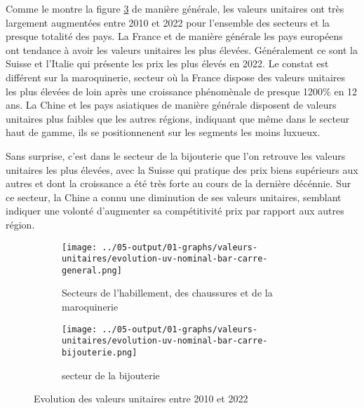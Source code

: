 \documentclass[french,10pt,a4paper]{article}
\begin{document}
Comme le montre la figure \ref{fig:valeurs-unitaires} de manière générale, les valeurs unitaires ont très largement augmentées entre 2010 et 2022 pour l'ensemble des secteurs et la presque totalité des pays. La France et de manière générale les pays européens ont tendance à avoir les valeurs unitaires les plus élevées. Généralement ce sont la Suisse et l'Italie qui présente les prix les plus élevés en 2022. Le constat est différent sur la maroquinerie, secteur où la France dispose des valeurs unitaires les plus élevées de loin après une croissance phénomènale de presque 1200\% en 12 ans. La Chine et les pays asiatiques de manière générale disposent de valeurs unitaires plus faibles que les autres régions, indiquant que même dans le secteur haut de gamme, ils se positionnenent sur les segments les moins luxueux.

Sans surprise, c'est dans le secteur de la bijouterie que l'on retrouve les valeurs unitaires les plus élevées, avec la Suisse qui pratique des prix biens supérieurs aux autres et dont la croissance a été très forte au cours de la dernière décénnie. Sur ce secteur, la Chine a connu une diminution de ses valeurs unitaires, semblant indiquer une volonté d'augmenter sa compétitivité prix par rapport aux autres région. 


\begin{figure}[!h]
  \centering
  \begin{subfigure}{\textwidth}
    \centering    \texttt{[image: ../05-output/01-graphs/valeurs-unitaires/evolution-uv-nominal-bar-carre-general.png]}
    \caption{Secteurs de l'habillement, des chaussures et de la maroquinerie}
    \label{fig:evolution-uv-nominal-bar-carre-general}
  \end{subfigure}
  \vspace{0.5cm}
  \begin{subfigure}{\textwidth}
    \centering \texttt{[image: ../05-output/01-graphs/valeurs-unitaires/evolution-uv-nominal-bar-carre-bijouterie.png]}
 \caption{secteur de la bijouterie}
 \label{fig:evolution-uv-nominal-bar-carre-bijouterie.png}
  \end{subfigure}
  \caption{Evolution des valeurs unitaires entre 2010 et 2022}
  \label{fig:valeurs-unitaires}
\end{figure}
\end{document}
